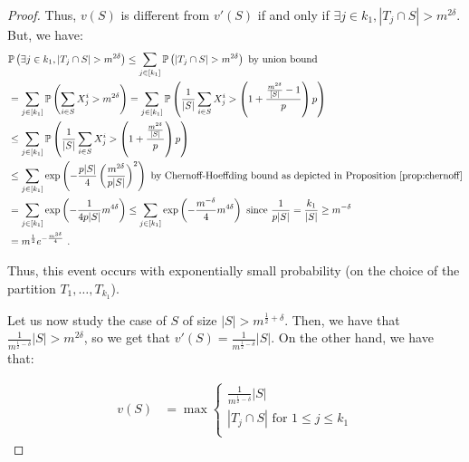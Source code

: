 \begin{proof}
    Thus, $v(S)$ is different from $v'(S)$ if and only if $\exists j \in k_1, |T_j \cap S| > m^{2\delta}$. But, we have:
    \begin{equation}
      \begin{aligned}
        &\mathbb{P}\left(\exists j \in k_1, |T_j \cap S| > m^{2\delta}\right) \leq \sum_{j \in [k_1]} \mathbb{P}\left(|T_j \cap S| > m^{2\delta}\right) \text{ by union bound}\\
        &=\sum_{j \in [k_1]} \mathbb{P}\left(\sum_{i \in S}X_j^i > m^{2\delta}\right)
        =\sum_{j \in [k_1]} \mathbb{P}\left(\frac{1}{|S|}\sum_{i \in S}X_j^i > \left(1 + \frac{\frac{m^{2\delta}}{[S|}-1}{p}\right)p \right)\\
        &\leq \sum_{j \in [k_1]} \mathbb{P}\left(\frac{1}{|S|}\sum_{i \in S}X_j^i > \left(1 + \frac{\frac{m^{2\delta}}{|S|}}{p}\right)p \right)\\
        &\leq \sum_{j \in [k_1]}\exp\left(-\frac{p|S|}{4}\left(\frac{m^{2\delta}}{p|S|}\right)^2\right) \text{ by Chernoff-Hoeffding bound as depicted in Proposition~\ref{prop:chernoff}}\\
        &= \sum_{j \in [k_1]}\exp\left(-\frac{1}{4p|S|}m^{4\delta}\right) \leq \sum_{j \in [k_1]}\exp\left(-\frac{m^{-\delta}}{4}m^{4\delta}\right) \text{ since } \frac{1}{p|S|} = \frac{k_1}{|S|} \geq m^{-\delta}\\
        &= m^{\frac{1}{2}}e^{-\frac{m^{3\delta}}{4}}\ .
      \end{aligned}
    \end{equation}

    Thus, this event occurs with exponentially small probability (on the choice of the partition $T_1,\ldots,T_{k_1}$).

    Let us now study the case of $S$ of size $|S| > m^{\frac{1}{2}+\delta}$. Then, we have that $\frac{1}{m^{\frac{1}{2}-\delta}}|S| > m^{2\delta}$, so we get that $v'(S) = \frac{1}{m^{\frac{1}{2}-\delta}}|S|$. On the other hand, we have that:
    
    \begin{equation}
    \begin{aligned}
      v(S) &= \max\begin{cases}
      \frac{1}{m^{\frac{1}{2}-\delta}}|S|\\
      |T_j \cap S| \text{ for } 1 \leq j \leq k_1\\
      \end{cases}
    \end{aligned}
    \end{equation}
    

\end{proof}
